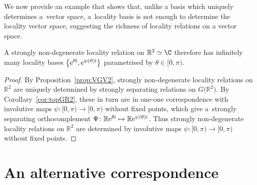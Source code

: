 \documentclass[10pt,a4paper]{amsart}
\numberwithin{equation}{section}
\newcommand{\R}{\mathbb{R}}
\begin{document}
We now provide an example that shows that, unlike a basis which uniquely determines a~vector space, a~locality basis is not enough to determine the locality vector space, suggesting the richness of locality relations on a vector space.

\begin{Remark}
	A strongly non-degenerate locality relation on $\R^2\simeq \C$ therefore has infinitely many locality bases $\big\{{\rm e}^{\theta {\rm i}}, {\rm e}^{\psi(\theta){\rm i}}\big\}$ parametrised by $\theta\in [0, \pi)$.
\end{Remark}
\begin{proof}By Proposition~\ref{prop:VGV2}, strongly non-degenerate locality relations on $\R^2$ are uniquely deter\-mi\-ned by strongly separating relations on $G\big(\R^2\big)$. By Corollary~\ref{cor:topGR2}, these in turn are in one-one correspondence with involutive maps $\psi\colon [0,\pi)\to [0, \pi)$ without fixed points, which give a~strongly separating orthocomplement $\Psi\colon \R {\rm e}^{\theta {\rm i}}\mapsto \R {\rm e}^{\psi(\theta){\rm i}}$. Thus strongly non-degenerate loca\-lity relations on $\R^2$ are determined by involutive maps $\psi\colon [0,\pi)\to [0, \pi)$ without fixed points. \end{proof}

\appendix
\section{An alternative correspondence}
\end{document}
